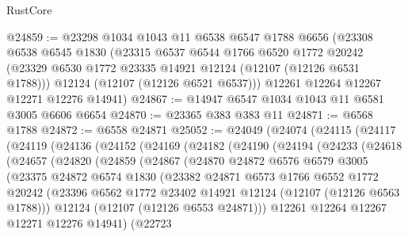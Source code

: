 \begin{lexlean}{RustCore}
\begin{coremodule}
@24859 := @23298
    @1034
    @1043
    @11
    @6538
    @6547
    @1788
    @6656
    (@23308
      @6538
      @6545
      @1830
      (@23315
        @6537
        @6544
        @1766
        @6520
        @1772
        @20242
        (@23329 @6530 @1772 @23335 @14921 @12124 (@12107 (@12126 @6531 @1788)))
        @12124
        (@12107 (@12126 @6521 @6537)))
      @12261
      @12264
      @12267
      @12271
      @12276
      @14941)
@24867 := @14947 @6547 @1034 @1043 @11 @6581 @3005 @6606 @6654
@24870 := @23365 @383 @383 @11
@24871 := @6568 @1788
@24872 := @6558 @24871
@25052 := @24049
    (@24074
      (@24115
        (@24117
          (@24119
            (@24136
              (@24152
                (@24169
                  (@24182
                    (@24190
                      (@24194
                        (@24233
                          (@24618
                            (@24657
                              (@24820
                                (@24859
                                  (@24867
                                    (@24870
                                      @24872
                                      @6576
                                      @6579
                                      @3005
                                      (@23375
                                        @24872
                                        @6574
                                        @1830
                                        (@23382
                                          @24871
                                          @6573
                                          @1766
                                          @6552
                                          @1772
                                          @20242
                                          (@23396
                                            @6562
                                            @1772
                                            @23402
                                            @14921
                                            @12124
                                            (@12107 (@12126 @6563 @1788)))
                                          @12124
                                          (@12107 (@12126 @6553 @24871)))
                                        @12261
                                        @12264
                                        @12267
                                        @12271
                                        @12276
                                        @14941)
                                      (@22723

\end{coremodule}
\end{lexlean}
